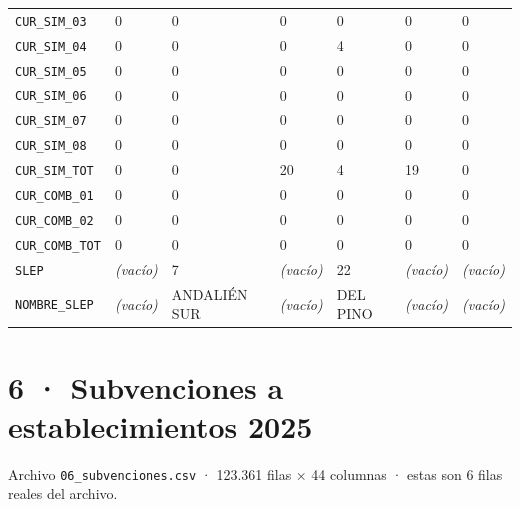 \documentclass[10pt]{article}
\begin{document}
\begin{xltabular}{\linewidth}{@{}p{4.3cm} Y Y Y Y Y Y @{}}
\texttt{CUR\_\allowbreak{}SIM\_\allowbreak{}03} & 0 & 0 & 0 & 0 & 0 & 0 \\
\texttt{CUR\_\allowbreak{}SIM\_\allowbreak{}04} & 0 & 0 & 0 & 4 & 0 & 0 \\
\texttt{CUR\_\allowbreak{}SIM\_\allowbreak{}05} & 0 & 0 & 0 & 0 & 0 & 0 \\
\texttt{CUR\_\allowbreak{}SIM\_\allowbreak{}06} & 0 & 0 & 0 & 0 & 0 & 0 \\
\texttt{CUR\_\allowbreak{}SIM\_\allowbreak{}07} & 0 & 0 & 0 & 0 & 0 & 0 \\
\texttt{CUR\_\allowbreak{}SIM\_\allowbreak{}08} & 0 & 0 & 0 & 0 & 0 & 0 \\
\texttt{CUR\_\allowbreak{}SIM\_\allowbreak{}TOT} & 0 & 0 & 20 & 4 & 19 & 0 \\
\texttt{CUR\_\allowbreak{}COMB\_\allowbreak{}01} & 0 & 0 & 0 & 0 & 0 & 0 \\
\texttt{CUR\_\allowbreak{}COMB\_\allowbreak{}02} & 0 & 0 & 0 & 0 & 0 & 0 \\
\texttt{CUR\_\allowbreak{}COMB\_\allowbreak{}TOT} & 0 & 0 & 0 & 0 & 0 & 0 \\
\texttt{SLEP} & \textit{\color{gris}(vacío)} & 7 & \textit{\color{gris}(vacío)} & 22 & \textit{\color{gris}(vacío)} & \textit{\color{gris}(vacío)} \\
\texttt{NOMBRE\_\allowbreak{}SLEP} & \textit{\color{gris}(vacío)} & ANDALIÉN SUR & \textit{\color{gris}(vacío)} & DEL PINO & \textit{\color{gris}(vacío)} & \textit{\color{gris}(vacío)} \\
\end{xltabular}
\normalsize

\clearpage
\hypertarget{base6}{}
\section{6 · Subvenciones a establecimientos 2025}
\small Archivo \texttt{06\_subvenciones.csv} · 123.361 filas × 44 columnas · estas son 6 filas reales del archivo.\normalsize
\end{document}
